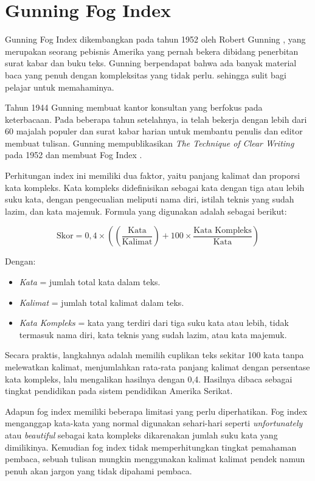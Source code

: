 \section{Gunning Fog Index}
Gunning Fog Index dikembangkan pada tahun 1952 oleh Robert Gunning \cite{gunning1952technique}, yang merupakan seorang pebisnis Amerika yang pernah bekera dibidang penerbitan surat kabar dan buku teks. Gunning berpendapat bahwa ada banyak material baca yang penuh dengan kompleksitas yang tidak perlu. sehingga sulit bagi pelajar untuk memahaminya.

Tahun 1944 Gunning membuat kantor konsultan yang berfokus pada keterbacaan.  Pada beberapa tahun setelahnya, ia telah bekerja dengan lebih dari 60 majalah populer dan surat kabar harian untuk membantu penulis dan editor membuat tulisan. Gunning mempublikasikan \textit{The Technique of Clear Writing} pada 1952 dan membuat Fog Index \cite{gunning1952technique}.

Perhitungan index ini memiliki dua faktor, yaitu panjang kalimat dan proporsi kata kompleks. Kata kompleks didefinisikan sebagai kata dengan tiga atau lebih suku kata, dengan pengecualian meliputi nama diri, istilah teknis yang sudah lazim, dan kata majemuk. Formula yang digunakan adalah sebagai berikut:

\begin{equation}
\text{Skor} = 0{,}4 \times \left( \left( \frac{\text{Kata}}{\text{Kalimat}} \right) + 100 \times \frac{\text{Kata Kompleks}}{\text{Kata}} \right)
\end{equation}

Dengan:
\begin{itemize}
  \item \textit{Kata} = jumlah total kata dalam teks.
  \item \textit{Kalimat} = jumlah total kalimat dalam teks.
  \item \textit{Kata Kompleks} = kata yang terdiri dari tiga suku kata atau lebih, tidak termasuk nama diri, kata teknis yang sudah lazim, atau kata majemuk.
\end{itemize}

Secara praktis, langkahnya adalah memilih cuplikan teks sekitar 100 kata tanpa melewatkan kalimat, menjumlahkan rata-rata panjang kalimat dengan persentase kata kompleks, lalu mengalikan hasilnya dengan 0,4. Hasilnya dibaca sebagai tingkat pendidikan  pada sistem pendidikan Amerika Serikat.

Adapun fog index memiliki beberapa limitasi yang perlu diperhatikan. Fog index menganggap kata-kata yang normal digunakan sehari-hari seperti \textit{unfortunately} atau \textit{beautiful} sebagai kata kompleks dikarenakan jumlah suku kata yang dimilikinya. Kemudian fog index tidak memperhitungkan tingkat pemahaman pembaca, sebuah tulisan mungkin menggunakan kalimat kalimat pendek namun penuh akan jargon yang tidak dipahami pembaca. 

